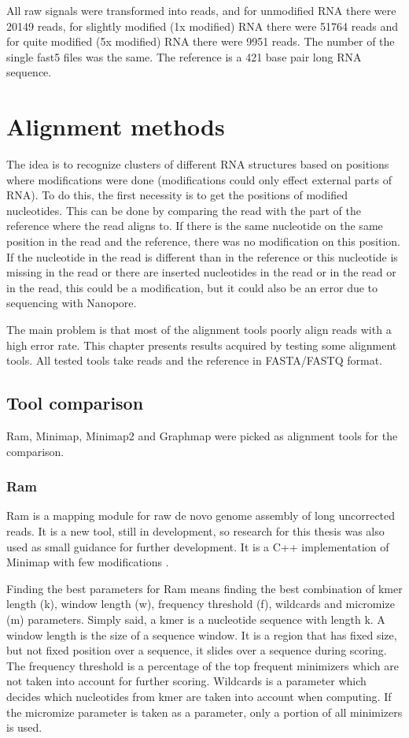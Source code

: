 \documentclass[times, utf8, zavrsni, numeric]{fer}
\begin{document}
All raw signals were transformed into reads, and for unmodified RNA there were 20149 reads, 
for slightly modified (1x modified) RNA there were 51764 reads and 
for quite modified (5x modified) RNA there were 9951 reads.
The number of the single fast5 files was the same.
The reference is a 421 base pair long RNA sequence. 



\chapter{Alignment methods}
The idea is to recognize clusters of different RNA structures based on positions where modifications were done 
(modifications could only effect external parts of RNA). To do this, the first necessity is to
get the positions of modified nucleotides. This can be done by comparing the read with the part of the reference 
where the read aligns to. If there is the same nucleotide on the same position in the read and the reference, 
there was no modification on this position. If the nucleotide in the read is different than in the reference 
or this nucleotide is missing in the read or there are inserted nucleotides in the read or in the read or in the read, 
this could be a modification, but it could also be an error due to sequencing with Nanopore.

The main problem is that most of the alignment tools poorly align reads with a high error rate. 
This chapter presents results acquired by testing some alignment tools. All tested tools take reads and the reference
in FASTA/FASTQ format.

\section{Tool comparison}
Ram, Minimap, Minimap2 and Graphmap were picked as alignment tools for the comparison.

\subsection{Ram}
Ram is a mapping module for raw de novo genome assembly of long uncorrected reads. It is a new tool, still in 
development, so research for this thesis was also used as small guidance for further development.
It is a C++ implementation of Minimap with few modifications \cite{ram}.

Finding the best parameters for Ram means finding the best combination of kmer length (k), window length (w), 
frequency threshold (f), wildcards and micromize (m) parameters. Simply said, a kmer is a nucleotide sequence with length k.
A window length is the size of a sequence window. It is a region that has fixed size, but not fixed position over a 
sequence, it slides over a sequence during scoring. The frequency threshold is a percentage of the top 
frequent minimizers which are not taken into account for further scoring. Wildcards is a parameter which decides 
which nucleotides from kmer are taken into account when computing. If the micromize parameter is taken as a parameter, 
only a portion of all minimizers is used. 
\end{document}
